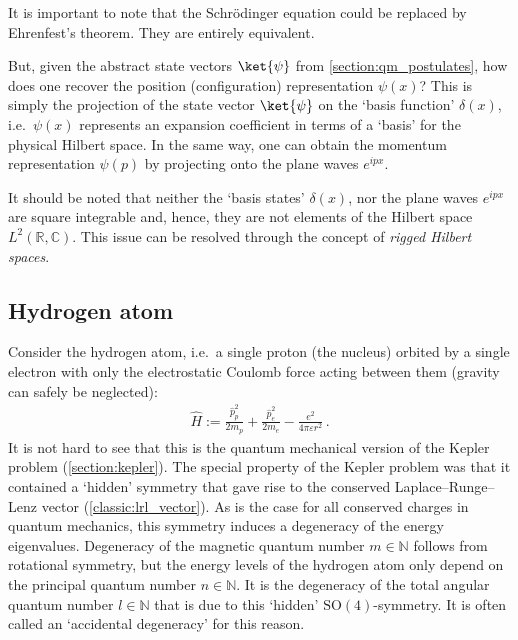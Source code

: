     \begin{remark}[Equivalence]
        It is important to note that the Schr\"odinger equation could be replaced by Ehrenfest's theorem. They are entirely equivalent.
    \end{remark}

    But, given the abstract state vectors $\ket{\psi}$ from \cref{section:qm_postulates}, how does one recover the position (configuration) representation $\psi(x)$? This is simply the projection of the state vector $\ket{\psi}$ on the `basis function' $\delta(x)$, i.e.~$\psi(x)$ represents an expansion coefficient in terms of a `basis' for the physical Hilbert space. In the same way, one can obtain the momentum representation $\psi(p)$ by projecting onto the plane waves $e^{ipx}$.

    \begin{remark}
        It should be noted that neither the `basis states' $\delta(x)$, nor the plane waves $e^{ipx}$ are square integrable and, hence, they are not elements of the Hilbert space $L^2(\mathbb{R},\mathbb{C})$. This issue can be resolved through the concept of \textit{rigged Hilbert spaces}.
    \end{remark}

\subsection{Hydrogen atom}

    Consider the hydrogen atom, i.e.~a single proton (the nucleus) orbited by a single electron with only the electrostatic Coulomb force acting between them (gravity can safely be neglected):
    \begin{gather}
        \widehat{H} := \frac{\widehat{p}_p^2}{2m_p} + \frac{\widehat{p}_e^2}{2m_e} - \frac{e^2}{4\pi\varepsilon r^2}\,.
    \end{gather}
    It is not hard to see that this is the quantum mechanical version of the Kepler problem (\cref{section:kepler}). The special property of the Kepler problem was that it contained a `hidden' symmetry that gave rise to the conserved Laplace--Runge--Lenz vector (\cref{classic:lrl_vector}). As is the case for all conserved charges in quantum mechanics, this symmetry induces a degeneracy of the energy eigenvalues. Degeneracy of the magnetic quantum number $m\in\mathbb{N}$ follows from rotational symmetry, but the energy levels of the hydrogen atom only depend on the principal quantum number $n\in\mathbb{N}$. It is the degeneracy of the total angular quantum number $l\in\mathbb{N}$ that is due to this `hidden' $\mathrm{SO}(4)$-symmetry. It is often called an `accidental degeneracy' for this reason.

